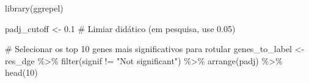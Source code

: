 \documentclass[
  letterpaper,
  DIV=11,
  numbers=noendperiod]{scrreprt}
\newenvironment{Shaded}{\begin{snugshade}}{\end{snugshade}}
\newcommand{\CommentTok}[1]{\textcolor[rgb]{0.37,0.37,0.37}{#1}}
\newcommand{\DecValTok}[1]{\textcolor[rgb]{0.68,0.00,0.00}{#1}}
\newcommand{\FloatTok}[1]{\textcolor[rgb]{0.68,0.00,0.00}{#1}}
\newcommand{\FunctionTok}[1]{\textcolor[rgb]{0.28,0.35,0.67}{#1}}
\newcommand{\NormalTok}[1]{\textcolor[rgb]{0.00,0.23,0.31}{#1}}
\newcommand{\OtherTok}[1]{\textcolor[rgb]{0.00,0.23,0.31}{#1}}
\newcommand{\SpecialCharTok}[1]{\textcolor[rgb]{0.37,0.37,0.37}{#1}}
\newcommand{\StringTok}[1]{\textcolor[rgb]{0.13,0.47,0.30}{#1}}
\begin{document}
\begin{Shaded}
\begin{Highlighting}[]
\FunctionTok{library}\NormalTok{(ggrepel)}

\NormalTok{padj\_cutoff }\OtherTok{\textless{}{-}} \FloatTok{0.1}  \CommentTok{\# Limiar didático (em pesquisa, use 0.05)}

\CommentTok{\# Selecionar os top 10 genes mais significativos para rotular}
\NormalTok{genes\_to\_label }\OtherTok{\textless{}{-}}\NormalTok{ res\_dge }\SpecialCharTok{\%\textgreater{}\%}
  \FunctionTok{filter}\NormalTok{(signif }\SpecialCharTok{!=} \StringTok{"Not significant"}\NormalTok{) }\SpecialCharTok{\%\textgreater{}\%}
  \FunctionTok{arrange}\NormalTok{(padj) }\SpecialCharTok{\%\textgreater{}\%}
  \FunctionTok{head}\NormalTok{(}\DecValTok{10}\NormalTok{)}


\end{Highlighting}
\end{Shaded}
\end{document}
